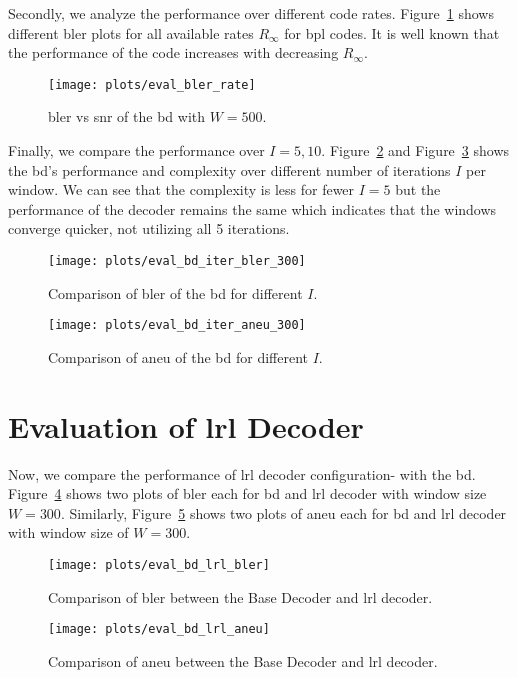Secondly, we analyze the performance over different code rates. Figure~\ref{fig:eval_bler_rate} shows different \gls{bler} plots for all available rates $R_\infty$ for \gls{bpl} codes. It is well known that the performance of the code increases with decreasing $R_\infty$.
\begin{figure}[htbp]
  \centering
  \texttt{[image: plots/eval\_bler\_rate]}
  \caption{\gls{bler} vs \gls{snr} of the \acrfull{bd} with $W=500$.}
  \label{fig:eval_bler_rate}
\end{figure}

Finally, we compare the performance over $I=5,10$. Figure~\ref{fig:eval_bd_iter_bler_300} and Figure~\ref{fig:eval_bd_iter_aneu_300} shows the \gls{bd}'s performance and complexity over different number of iterations $I$ per window. We can see that the complexity is less for fewer $I=5$ but the performance of the decoder remains the same which indicates that the windows converge quicker, not utilizing all 5 iterations.
\begin{figure}[htbp]
  \centering
  \texttt{[image: plots/eval\_bd\_iter\_bler\_300]}
  \caption{Comparison of \gls{bler} of the \acrfull{bd} for different $I$.}
  \label{fig:eval_bd_iter_bler_300}
\end{figure}
\begin{figure}[htbp]
  \centering
  \texttt{[image: plots/eval\_bd\_iter\_aneu\_300]}
  \caption{Comparison of \gls{aneu} of the \acrfull{bd} for different $I$.}
  \label{fig:eval_bd_iter_aneu_300}
\end{figure}

\section{Evaluation of \acrlong{lrl} Decoder}
Now, we compare the performance of \gls{lrl} decoder configuration- with the \gls{bd}. Figure~\ref{fig:eval_bd_lrl_bler} shows two plots of \gls{bler} each for \gls{bd} and \gls{lrl} decoder with window size $W=300$. Similarly, Figure~\ref{fig:eval_bd_lrl_aneu} shows two plots of \gls{aneu} each for \gls{bd} and \gls{lrl} decoder with window size of $W=300$.
\begin{figure}[htbp]
  \centering
  \texttt{[image: plots/eval\_bd\_lrl\_bler]}
  \caption{Comparison of \gls{bler} between the Base Decoder and \gls{lrl} decoder.}
  \label{fig:eval_bd_lrl_bler}
\end{figure}
\begin{figure}[htbp]
  \centering
  \texttt{[image: plots/eval\_bd\_lrl\_aneu]}
  \caption{Comparison of \gls{aneu} between the Base Decoder and \gls{lrl} decoder.}
  \label{fig:eval_bd_lrl_aneu}
\end{figure}

